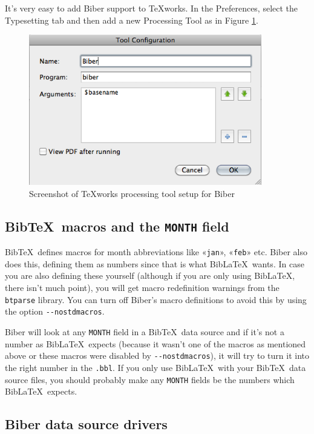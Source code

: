 \documentclass{ltxdockit}
\begin{document}
It's very easy to add Biber support to \TeX works. In the Preferences,
select the Typesetting tab and then add a new Processing Tool as in Figure
\ref{fig:biber-texworks}.

\begin{figure}[!htpb]
  \centering
  \includegraphics[width=4in,keepaspectratio=true]{biber-texworks.png}
  \caption{Screenshot of \TeX works processing tool setup for Biber}
  \label{fig:biber-texworks}
\end{figure}

\subsection{Bib\TeX\ macros and the \texttt{MONTH} field}

Bib\TeX\ defines macros for month abbreviations
like «\verb+jan+», «\verb+feb+» etc. Biber also does this,
defining them as numbers since that is what Bib\LaTeX\ wants. In
case you are also defining these yourself (although if you are only
using Bib\LaTeX, there isn't much point), you will get macro
redefinition warnings from the \verb+btparse+ library. You can turn
off Biber's macro definitions to avoid this by using the option
\verb+--nostdmacros+.

Biber will look at any \verb+MONTH+ field in a Bib\TeX\ data
source and if it's not a number as Bib\LaTeX\ expects (because it
wasn't one of the macros as mentioned above or these macros were disabled
by \verb+--nostdmacros+), it will try to turn it into the right number in
the \verb+.bbl+. If you only use Bib\LaTeX\ with your Bib\TeX\
data source files, you should probably make any \verb+MONTH+ fields be the
numbers which Bib\LaTeX\ expects.

\subsection{Biber data source drivers}\label{dcf}
\end{document}
